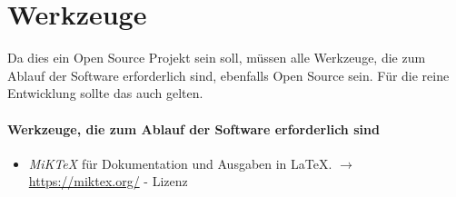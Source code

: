 \documentclass[english,ngerman,parskip=half,headsepline,footsepline]{scrreprt}
\newcounter{Enumi}
\begin{document}
	\section{Werkzeuge}
	\label{sec:Werkzeuge}
	
	Da dies ein Open Source Projekt sein soll, müssen alle Werkzeuge, die zum Ablauf der Software erforderlich sind, ebenfalls Open Source sein. Für die reine Entwicklung sollte das auch gelten.
	
	\paragraph{Werkzeuge, die zum Ablauf der Software erforderlich sind}
	\begin{itemize}
		
		\item\label{Werkzeug:MiKTeX}\emph{MiK\TeX} für Dokumentation und Ausgaben in \LaTeX. $\rightarrow$ \url{https://miktex.org/} - Lizenz \cite{bib:MiKTeX}
		
		\setcounter{Enumi}{\value{enumi}}
	\end{itemize}
	
\end{document}
